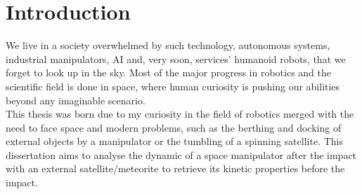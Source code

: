 \documentclass[a4paper,12pt,oneside]{report}
\begin{document}
\newpage

\begin{abstract}


\end{abstract}

\newpage
{}
\tableofcontents
\pagestyle{styletoc}
\chapter*{Introduction}
\pagestyle{stylenor}
We live in a society overwhelmed by such technology, autonomous systems, industrial manipulators, AI and, very soon, services' humanoid robots, that we forget to look up in the sky. Most of the major progress in robotics and the scientific field is done in space, where human curiosity is pushing our abilities beyond any imaginable scenario.\\
This thesis was born due to my curiosity in the field of robotics merged with the need to face space and modern problems, such as the berthing and docking of external objects by a manipulator or the tumbling of a spinning satellite. This dissertation aims to analyse the dynamic of a space manipulator after the impact with an external satellite/meteorite to retrieve its kinetic properties before the impact.
\clearpage
{}
\end{document}
